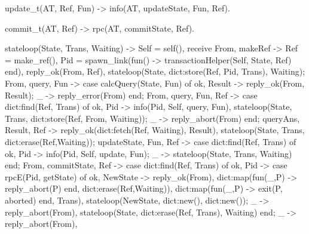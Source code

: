 \documentclass[11pt]{article}
\renewenvironment{verbatim}{}{}
\begin{document}
\begin{verbatim}
update_t(AT, Ref, Fun) -> 
    info(AT, {updateState, Fun, Ref}). %Asynchronous to not block

commit_t(AT, Ref) -> 
    rpc(AT, {commitState, Ref}).


%Server loop for the current state of the server, along with the current transactions

stateloop(State, Trans, Waiting) ->
    Self = self(),
    receive
        {From, makeRef} -> %make intermediate copy of state with new ref.
            Ref = make_ref(),
            Pid = spawn_link(fun() -> transactionHelper(Self, State, Ref) end),
            reply_ok(From, Ref),
            stateloop(State, dict:store(Ref, Pid, Trans), Waiting);
        {From, {query, Fun}} -> %query on state of server
            case calcQuery(State, Fun) of
                {ok, Result} -> reply_ok(From, Result);
                _ -> reply_error(From)
            end;
        {From, {query, Fun, Ref}} -> %query on state of transaction
            case dict:find(Ref, Trans) of
                {ok, Pid} -> 
                    info(Pid, {Self, query, Fun}),
                    stateloop(State, Trans, dict:store(Ref, From, Waiting));
                _ -> reply_abort(From)
            end;
        {queryAns, Result, Ref} ->
            reply_ok(dict:fetch(Ref, Waiting), Result),
            stateloop(State, Trans, dict:erase(Ref,Waiting));
        {updateState, Fun, Ref} -> %Update a current state of a transaction
            case dict:find(Ref, Trans) of
                {ok, Pid} -> info(Pid, {Self, update, Fun});
                _ -> stateloop(State, Trans, Waiting)
            end;
        {From, {commitState, Ref}} -> %Commit a transaction and abort all other
            case dict:find(Ref, Trans) of
                {ok, Pid} ->
                    case rpcE(Pid, getState) of
                        {ok, NewState} -> 
                            reply_ok(From),
                            dict:map(fun(_,P) -> reply_abort(P) end,
                                dict:erase(Ref,Waiting)), %Abort all blocking processes
                            dict:map(fun(_,P) -> exit(P, aborted) end, Trans), %Kill all transaction subprocesses
                            stateloop(NewState, dict:new(), dict:new()); %Set new state and abort all other transactions.;
                        _ -> 
                            reply_abort(From), %Something went wrong. Remove transaction.
                            stateloop(State, dict:erase(Ref, Trans), Waiting)
                    end;
                _ -> 
                    reply_abort(From),

\end{verbatim}
\end{document}
